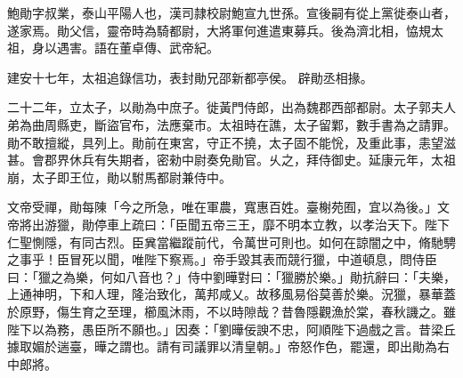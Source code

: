 \begin{pinyinscope}
 
 
 鮑勛字叔業，泰山平陽人也，漢司隷校尉鮑宣九世孫。宣後嗣有從上黨徙泰山者，遂家焉。勛父信，靈帝時為騎都尉，大將軍何進遣東募兵。後為濟北相，恊規太祖，身以遇害。語在董卓傳、武帝紀。
 
 
 建安十七年，太祖追錄信功，表封勛兄邵新都亭侯。
 辟勛丞相掾。
 
 
 
 
 二十二年，立太子，以勛為中庶子。徙黃門侍郎，出為魏郡西部都尉。太子郭夫人弟為曲周縣吏，斷盜官布，法應棄市。太祖時在譙，太子留鄴，數手書為之請罪。勛不敢擅縱，具列上。勛前在東宮，守正不撓，太子固不能恱，及重此事，恚望滋甚。會郡界休兵有失期者，密勑中尉奏免勛官。乆之，拜侍御史。延康元年，太祖崩，太子即王位，勛以駙馬都尉兼侍中。
 
 
 
 
 文帝受禪，勛每陳「今之所急，唯在軍農，寬惠百姓。臺榭苑囿，宜以為後。」文帝將出游獵，勛停車上疏曰：「臣聞五帝三王，靡不明本立教，以孝治天下。陛下仁聖惻隱，有同古烈。臣兾當繼蹤前代，令萬世可則也。如何在諒闇之中，脩馳騁之事乎！臣冒死以聞，唯陛下察焉。」帝手毀其表而競行獵，中道頓息，問侍臣曰：「獵之為樂，何如八音也？」侍中劉曄對曰：「獵勝於樂。」勛抗辭曰：「夫樂，上通神明，下和人理，隆治致化，萬邦咸乂。故移風易俗莫善於樂。況獵，暴華蓋於原野，傷生育之至理，櫛風沐雨，不以時隙哉？昔魯隱觀漁於棠，春秋譏之。雖陛下以為務，愚臣所不願也。」因奏：「劉曄佞諛不忠，阿順陛下過戲之言。昔梁丘據取媚於遄臺，曄之謂也。請有司議罪以清皇朝。」帝怒作色，罷還，即出勛為右中郎將。
 

\end{pinyinscope}
